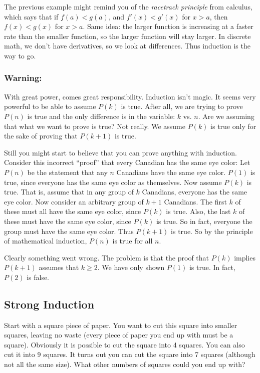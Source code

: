 \documentclass[12pt]{article}
\begin{document}
The previous example might remind you of the {\em racetrack principle} from calculus, which says that if $f(a) < g(a)$, and $f'(x) < g'(x)$ for $x > a$, then $f(x) < g(x)$ for $x > a$.  Same idea: the larger function is increasing at a faster rate than the smaller function, so the larger function will stay larger.  In discrete math, we don't have derivatives, so we look at differences.  Thus induction is the way to go.

\subsubsection*{Warning:}

With great power, comes great responsibility.  Induction isn't magic.  It seems very powerful to be able to assume $P(k)$ is true.  After all, we are trying to prove $P(n)$ is true and the only difference is in the variable: $k$ vs. $n$.  Are we assuming that what we want to prove is true?  Not really.  We assume $P(k)$ is true only for the sake of proving that $P(k+1)$ is true.

Still you might start to believe that you can prove anything with induction. Consider this incorrect ``proof'' that every Canadian has the same eye color: Let $P(n)$ be the statement that any $n$ Canadians have the same eye color.  $P(1)$ is true, since everyone has the same eye color as themselves.  Now assume $P(k)$ is true.  That is, assume that in any group of $k$ Canadians, everyone has the same eye color.  Now consider an arbitrary group of $k+1$ Canadians.  The first $k$ of these must all have the same eye color, since $P(k)$ is true.  Also, the last $k$ of these must have the same eye color, since $P(k)$ is true.  So in fact, everyone the group must have the same eye color.  Thus $P(k+1)$ is true.  So by the principle of mathematical induction, $P(n)$ is true for all $n$.

Clearly something went wrong.  The problem is that the proof that $P(k)$ implies $P(k+1)$ assumes that $k \ge 2$.  We have only shown $P(1)$ is true.  In fact, $P(2)$ is false.



\subsection{Strong Induction}

\begin{activity}
Start with a square piece of paper.  You want to cut this square into smaller squares, leaving no waste (every piece of paper you end up with must be a square).  Obviously it is possible to cut the square into 4 squares.  You can also cut it into 9 squares.  It turns out you can cut the square into 7 squares (although not all the same size).  What other numbers of squares could you end up with?
\end{activity}
\end{document}

